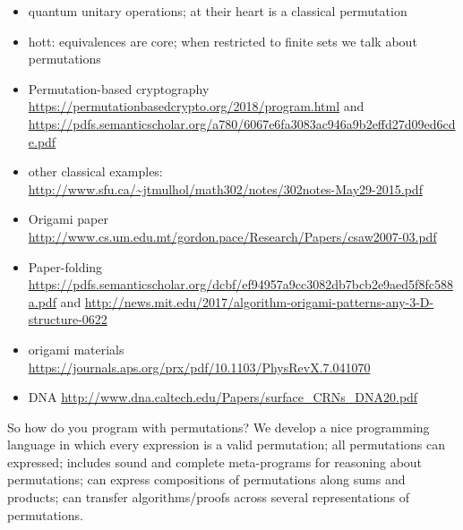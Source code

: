 \documentclass{article}
\begin{document}
\begin{itemize}
  \item quantum unitary operations; at their heart is a classical permutation
  \item hott: equivalences are core; when restricted to finite sets we talk about permutations
  \item Permutation-based cryptography \url{https://permutationbasedcrypto.org/2018/program.html} and \url{https://pdfs.semanticscholar.org/a780/6067e6fa3083ac946a9b2effd27d09ed6cde.pdf}
  \item other classical examples: \url{http://www.sfu.ca/~jtmulhol/math302/notes/302notes-May29-2015.pdf}
\item Origami paper \url{http://www.cs.um.edu.mt/gordon.pace/Research/Papers/csaw2007-03.pdf}
  \item Paper-folding \url{https://pdfs.semanticscholar.org/dcbf/ef94957a9cc3082db7bcb2e9aed5f8fc588a.pdf} and \url{http://news.mit.edu/2017/algorithm-origami-patterns-any-3-D-structure-0622}
  \item origami materials \url{https://journals.aps.org/prx/pdf/10.1103/PhysRevX.7.041070}
  \item DNA \url{http://www.dna.caltech.edu/Papers/surface_CRNs_DNA20.pdf}
\end{itemize}

So how do you program with permutations? We develop a nice programming language in which every expression is a valid permutation; all permutations can expressed; includes sound and complete meta-programs for reasoning about permutations; can express compositions of permutations along sums and products; can transfer algorithms/proofs across several representations of permutations.

\end{document}
